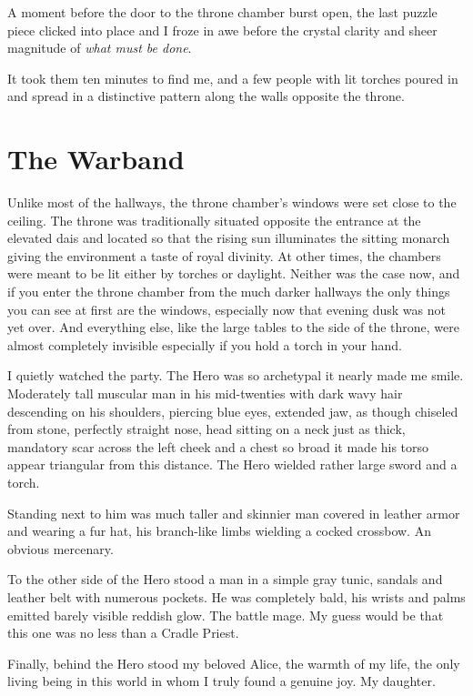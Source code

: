 A moment before the door to the throne chamber burst open, the last puzzle piece clicked into place and I froze in awe before the crystal clarity and sheer magnitude of \textit{what must be done}.

It took them ten minutes to find me, and a few people with lit torches poured in and spread in a distinctive pattern along the walls opposite the throne.

\section{The Warband}

Unlike most of the hallways, the throne chamber’s windows were set close to the ceiling. The throne was traditionally situated opposite the entrance at the elevated dais and located so that the rising sun illuminates the sitting monarch giving the environment a taste of royal divinity. At other times, the chambers were meant to be lit either by torches or daylight. Neither was the case now, and if you enter the throne chamber from the much darker hallways the only things you can see at first are the windows, especially now that evening dusk was not yet over. And everything else, like the large tables to the side of the throne, were almost completely invisible especially if you hold a torch in your hand.

I quietly watched the party. The Hero was so archetypal it nearly made me smile. Moderately tall muscular man in his mid-twenties with dark wavy hair descending on his shoulders, piercing blue eyes, extended jaw, as though chiseled from stone, perfectly straight nose, head sitting on a neck just as thick, mandatory scar across the left cheek and a chest so broad it made his torso appear triangular from this distance. The Hero wielded rather large sword and a torch.

Standing next to him was much taller and skinnier man covered in leather armor and wearing a fur hat, his branch-like limbs wielding a cocked crossbow. An obvious mercenary.

To the other side of the Hero stood a man in a simple gray tunic, sandals and leather belt with numerous pockets. He was completely bald, his wrists and palms emitted barely visible reddish glow. The battle mage. My guess would be that this one was no less than a Cradle Priest.

Finally, behind the Hero stood my beloved Alice, the warmth of my life, the only living being in this world in whom I truly found a genuine joy. My daughter.

